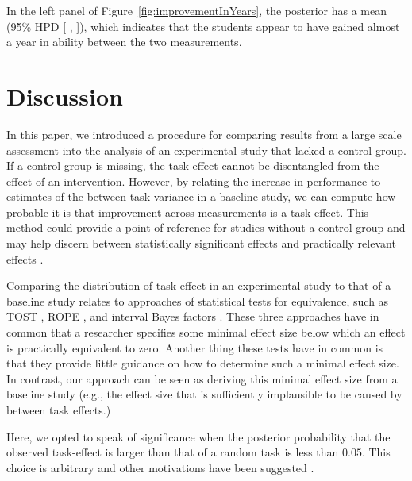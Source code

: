\documentclass[a4paper]{article}
\newcommand{\getVal}[3]{%
	\pgfplotstablegetelem{#1}{#2}\of{#3}%
	\pgfmathprintnumber{\pgfplotsretval}%
}
\newcommand{\getCI}[2]{95\% HPD [\getVal{#1}{Lower}{#2}, \getVal{#1}{Upper}{#2}]}
\newcommand{\DONa}	[1]		{\todo[inline, linecolor=gray, backgroundcolor=white]	{Don:	{#1}}}
\begin{document}
In the left panel of Figure~\ref{fig:improvementInYears}, the posterior has a mean \getVal{0}{mean}{\tbCRIimprovement} (\getCI{0}{\tbCRIimprovement}), which indicates that the students appear to have gained almost a year in ability between the two measurements.  

\section*{Discussion}
In this paper, we introduced a procedure for comparing results from a large scale assessment into the analysis of an experimental study that lacked a control group.
If a control group is missing, the task-effect cannot be disentangled from the effect of an intervention.
However, by relating the increase in performance to estimates of the between-task variance in a baseline study, we can compute how probable it is that improvement across measurements is a task-effect.
This method could provide a point of reference for studies without a control group and may help discern between statistically significant effects and practically relevant effects
\cite{hojat2004visitor, fan2001statistical}.

Comparing the distribution of task-effect in an experimental study to that of a baseline study relates to approaches of statistical tests for equivalence, such as TOST \cite{lakens2017equivalence}, ROPE \cite{kruschke2011bayesian}, and interval Bayes factors \cite{MoreyRouder2011}.
These three approaches have in common that a researcher specifies some minimal effect size below which an effect is practically equivalent to zero.
Another thing these tests have in common is that they provide little guidance on how to determine such a minimal effect size.
In contrast, our approach can be seen as deriving this minimal effect size from a baseline study (e.g., the effect size that is sufficiently implausible to be caused by between task effects.)

Here, we opted to speak of significance when the posterior probability that the observed task-effect is larger than that of a random task is less than $0.05$. This choice is arbitrary and other motivations have been suggested \cite{McShane2017abandon, BenjaminEtAl2018}.
\end{document}
